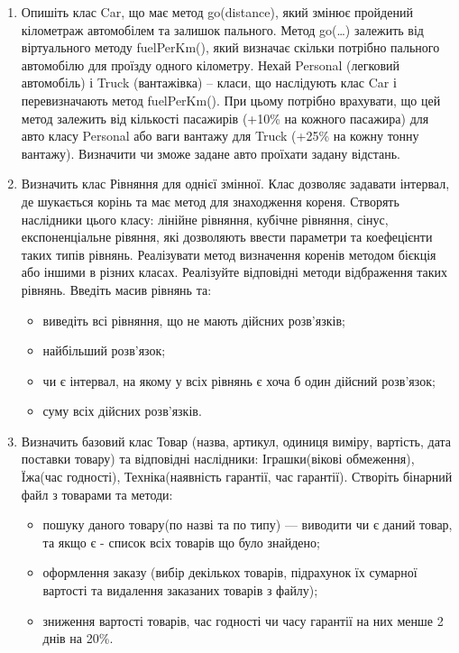 \documentclass[]{article}
\begin{document}
\begin{enumerate}
\item
  Опишіть клас Car, що має метод go(distance), який змінює пройдений
  кілометраж автомобілем та залишок пального. Метод go(\ldots{})
  залежить від віртуального методу fuelPerKm(), який визначає скільки
  потрібно пального автомобілю для проїзду одного кілометру. Нехай
  Personal (легковий автомобіль) і Truck (вантажівка) -- класи, що
  наслідують клас Car і перевизначають метод fuelPerKm(). При цьому
  потрібно врахувати, що цей метод залежить від кількості пасажирів
  (+10\% на кожного пасажира) для авто класу Personal або ваги вантажу
  для Truck (+25\% на кожну тонну вантажу). Визначити чи зможе задане
  авто проїхати задану відстань.

\item
Визначить клас Рівняння для однієї змінної. Клас дозволяє задавати інтервал,
де шукається корінь та має метод для знаходження кореня.
Створять наслідники цього класу: лінійне рівняння, кубічне рівняння, сінус,
експоненціальне рівяння, які дозволяють ввести параметри та коефецієнти таких типів
рівнянь. Реалізувати метод визначення коренів методом бієкція або іншими
в різних класах. Реалізуйте відповідні методи відбраження таких рівнянь.
Введіть масив рівнянь та:
\begin{itemize}
\item
виведіть всі рівняння, що не мають дійсних розв'язків;
\item
найбільший розв'язок;
\item
чи є інтервал, на якому у всіх рівнянь є хоча б один дійсний розв'язок;
\item
суму всіх дійсних розв'язків.
\end{itemize}

\item
Визначить базовий клас Товар (назва, артикул, одиниця виміру, вартість, дата поставки товару) та відповідні наслідники:
Іграшки(вікові обмеження), Їжа(час годності), Техніка(наявність гарантії, час гарантії).
Створіть бінарний файл з товарами та методи:
\begin{itemize}
\item
 пошуку даного товару(по назві та по типу) ---
виводити чи є даний товар, та якщо є - список всіх товарів що було знайдено; 
\item
оформлення заказу (вибір декількох товарів, підрахунок їх сумарної вартості та видалення заказаних товарів з файлу);
\item
зниження вартості товарів, час годності чи часу гарантії на них менше 2 днів на 20\%.
\end{itemize}


\end{enumerate}
\end{document}
